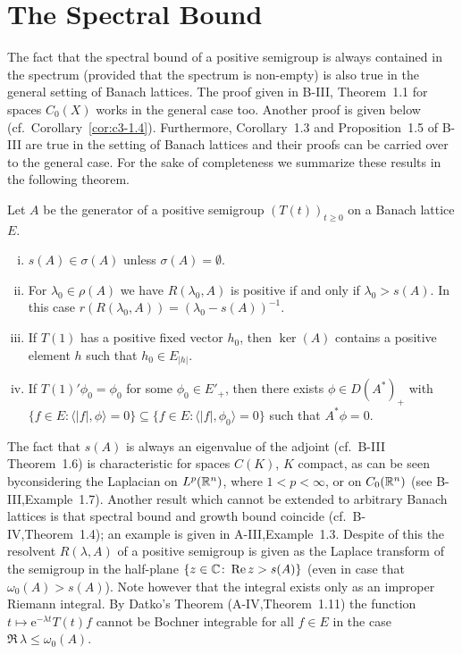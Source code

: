 \section{The Spectral Bound}\label{sec:c3-1}
The fact that the spectral bound of a positive semigroup is always contained in the spectrum (provided that the spectrum is non-empty) is also true in the general setting of Banach lattices.
The proof given in B-III, Theorem~1.1 for spaces $C_{0}(X)$ works in the general case too.
Another proof is given below (cf.\ Corollary~\ref{cor:c3-1.4}).
Furthermore, Corollary~1.3 and Proposition~1.5 of B-III are true in the setting of Banach lattices and their proofs can be carried over to the general case.
For the sake of completeness we summarize these results in the following theorem.
\begin{theorem}\label{thm:c3-1.1}
	Let $A$ be the generator of a positive semigroup $(T(t))_{t \geq 0}$ on a Banach lattice $E$.
	
	\begin{enumerate}[(i)]
		\item 
		$s(A) \in \sigma(A)$ unless $\sigma(A) = \emptyset$.
		
		\item 
		For $\lambda_{0} \in \rho(A)$ we have
		$R(\lambda_{0},A)$ is positive if and only if $\lambda_{0} > s(A)$.
		In this case $r(R(\lambda_{0},A)) = (\lambda_{0} - s(A))^{-1}$.
		
		\item 
		If $T(1)$ has a positive fixed vector $h_{0}$, then $\ker(A)$ contains a positive element $h$ such that $h_{0} \in E_{|h|}$.

		\item 
		If $T(1)'\phi_{0} = \phi_{0}$ for some $\phi_{0} \in E'_{+}$, then there exists $\phi \in D(A^*)_{+}$ with $\{f \in E \colon \langle |f|,\phi\rangle = 0\} \subseteq \{f \in E \colon \langle |f|,\phi_{0}\rangle = 0\}$ such that $A^*\phi = 0$.
	\end{enumerate}
\end{theorem}
The fact that $s(A)$ is always an eigenvalue of the adjoint (cf.\ B-III Theorem~1.6) is characteristic for spaces $C(K)$, $K$ compact, as can be seen byconsidering the Laplacian on $L^p(\mathbb{R} ^n)$, where $1 < p < \infty$, or on $C_{0}(\mathbb{R} ^n)$ (see B-III,Example~1.7).
Another result which cannot be extended to arbitrary Banach lattices is that spectral bound and growth bound coincide (cf.\ B-IV,Theorem~1.4); an example is given in A-III,Example~1.3.
Despite of this the resolvent $R(\lambda,A)$ of a positive semigroup is given as the Laplace transform of the semigroup in the half-plane $\{z \in \mathbb{C}  \colon \mathop{}\!\mathrm{Re}\, z > s(A)\}$ (even in case that $\omega_0(A) > s(A)$).
Note however that the integral exists only as an improper Riemann integral.
By Datko's Theorem (A-IV,Theorem~1.11) the function $t \mapsto \mathrm{e}^{-\lambda t}T(t)f$ cannot be Bochner integrable for all $f \in E$ in the case $\Re\, \lambda \leq \omega_0(A)$.

